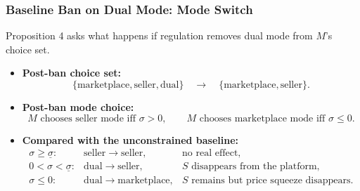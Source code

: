 \begin{frame}
  \frametitle{Baseline Ban on Dual Mode: Mode Switch}
  \footnotesize
  Proposition 4 asks what happens if regulation removes dual mode from $M$'s
  choice set.

  \begin{itemize}
    \item \textbf{Post-ban choice set:}
      \[
        \{\text{marketplace},\text{seller},\text{dual}\}
        \quad\longrightarrow\quad
        \{\text{marketplace},\text{seller}\}.
      \]

    \item \textbf{Post-ban mode choice:}
      \[
        M \text{ chooses seller mode iff } \sigma>0,
        \qquad
        M \text{ chooses marketplace mode iff } \sigma\leq0.
      \]

    \item \textbf{Compared with the unconstrained baseline:}
      \[
        \begin{array}{lll}
          \sigma\geq\underline{\sigma}: & \text{seller}\to\text{seller},
          & \text{no real effect},\\
          0<\sigma<\underline{\sigma}: & \text{dual}\to\text{seller},
          & S \text{ disappears from the platform},\\
          \sigma\leq0: & \text{dual}\to\text{marketplace},
          & S \text{ remains but price squeeze disappears}.
        \end{array}
      \]
  \end{itemize}
\end{frame}

